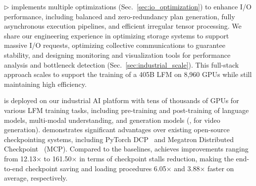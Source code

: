 $\triangleright$ \sys{} implements multiple optimizations (Sec.~\ref{sec:io_optimization}) to enhance I/O performance, including balanced and zero-redundancy plan generation, fully asynchronous execution pipelines, and efficient irregular tensor processing. 
We share our engineering experience in optimizing storage systems to support massive I/O requests, optimizing collective communications to guarantee stability, and designing monitoring and visualization tools for performance analysis and bottleneck detection
(Sec.~\ref{sec:industrial_scale}).
This full-stack approach scales \sys{} to support the training of a 405B LFM on 8,960 GPUs while still maintaining high efficiency.

\sys{} is deployed on our industrial AI platform with tens of thousands of GPUs for various LFM training tasks, including pre-training and post-training of language models, multi-modal understanding, and generation models (\eg, for video generation). %
\sys{} demonstrates significant advantages over existing open-source checkpointing systems, including PyTorch DCP~\cite{torch-dcp} and Megatron Distributed Checkpoint~\cite{megatron-dcp} (MCP).
Compared to the baselines, \sys{} achieves improvements ranging from 12.13$\times$ to 161.50$\times$ in terms of checkpoint stalls reduction, making the end-to-end checkpoint saving and loading procedures 6.05$\times$ and 3.88$\times$ faster on average, respectively.





